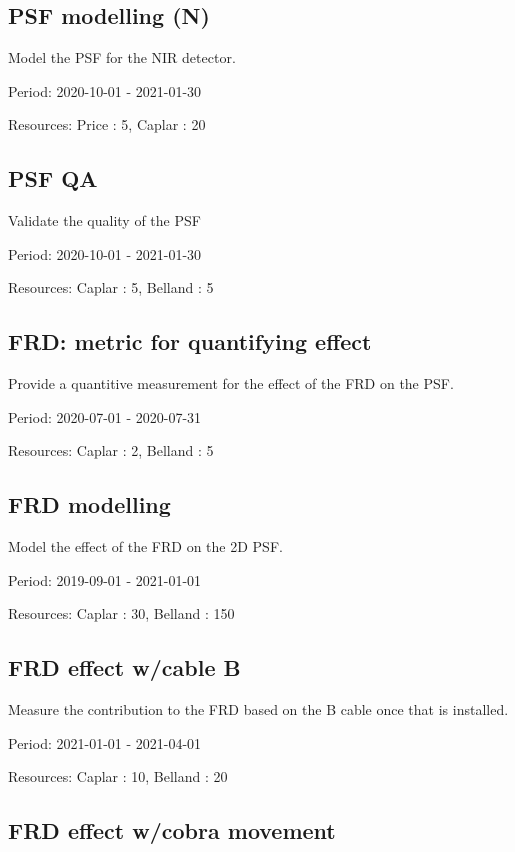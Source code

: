 \subsection{PSF modelling (N)}

Model the PSF for the NIR detector.

Period: 2020-10-01 - 2021-01-30

Resources: Price : 5, Caplar : 20

\subsection{PSF QA}

Validate the quality of the PSF

Period: 2020-10-01 - 2021-01-30

Resources: Caplar : 5, Belland : 5

\subsection{FRD: metric for quantifying effect}

Provide a quantitive measurement for the effect of the FRD on the PSF.

Period: 2020-07-01 - 2020-07-31

Resources: Caplar : 2, Belland : 5

\subsection{FRD modelling}

Model the effect of the FRD on the 2D PSF.

Period: 2019-09-01 - 2021-01-01

Resources: Caplar : 30, Belland : 150

\subsection{FRD effect w/cable B}

Measure the contribution to the FRD based on the B cable once that is installed.

Period: 2021-01-01 - 2021-04-01

Resources: Caplar : 10, Belland : 20

\subsection{FRD effect w/cobra movement}

